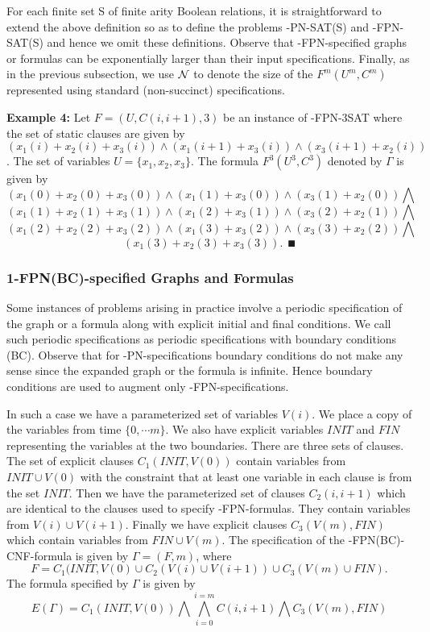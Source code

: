 For each finite set {\sf S} of finite arity Boolean relations, 
it is straightforward to extend the above 
definition so as to define the problems {-PN-SAT(S)}  
and {-FPN-SAT(S)}  and  hence we omit these
definitions.  Observe that 
{-FPN}-specified graphs or formulas can be exponentially larger 
than their input specifications. Finally, as in the previous subsection, 
we use ${\cal N}$ to denote the size of the $F^m(U^m, C^m)$ represented
using standard (non-succinct) specifications.


	 
\noindent
{\bf Example 4:}
Let $F= (U,C(i, i+1),3)$ be an instance of  {-FPN-3SAT} 
where the set of static clauses are given by
$(x_1(i) + x_2(i) + x_3(i) )  \wedge 
(x_1(i+1) + x_3(i)) \wedge (x_3(i+1) + x_2(i))$.
The set of variables $U = \{ x_1, x_2, x_3 \}$.
The formula $F^3(U^3,C^3)$ denoted by $\Gamma$ is given by 
\[(x_1(0) + x_2(0) + x_3(0)) \wedge (x_1(1) + x_3(0)) \wedge (x_3(1) + x_2(0)) 
\bigwedge \]
\[(x_1(1) + x_2(1) + x_3(1)) \wedge (x_1(2) + x_3(1)) \wedge (x_3(2) + x_2(1)) 
\bigwedge \]
\[(x_1(2) + x_2(2) + x_3(2)) \wedge (x_1(3) + x_3(2)) \wedge (x_3(3) + x_2(2)) 
\bigwedge \]
\[(x_1(3) + x_2(3) + x_3(3)). ~~\QED\]



\subsubsection{1-FPN(BC)-specified Graphs and Formulas}
Some instances of problems arising in practice involve a periodic specification
of the graph or a formula along with explicit initial and final conditions.
We call such periodic specifications as periodic specifications with boundary
conditions ({\sf BC}). 
Observe that for {-PN}-specifications boundary conditions
do not make any sense since the expanded graph or the formula is infinite.
Hence boundary conditions are used to augment only {-FPN}-specifications.

In such a case we have a parameterized set of variables $V(i)$.
We place a copy of the variables from time $\{ 0, \cdots m \}$.
We also have explicit variables $INIT$ and $FIN$ 
representing the variables at the
two boundaries. There are three sets of clauses.
The set of explicit clauses $C_1(INIT, V(0))$ contain variables from 
$INIT \cup V(0)$  with the constraint that at least one variable in each clause
is from the set $INIT$. Then we have the parameterized set of clauses
$C_2(i, i+1)$ which are identical to the clauses used to specify 
{-FPN}-formulas. They contain variables from $V(i) \cup V(i+1)$.
Finally we have explicit clauses $C_3(V(m), FIN)$ which contain variables from
$FIN \cup V(m)$. 
The specification of the {-FPN(BC)-CNF}-formula is given by
$\Gamma = ( F, m)$, where 
\[F = C_1(INIT, V(0) \cup C_2(V(i) \cup V(i+1)) \cup C_3(V(m) \cup FIN). \]
The formula specified by $\Gamma$ is given by 
\[E(\Gamma) =  
C_1(INIT, V(0)) \bigwedge \bigwedge_{i = 0}^{ i = m} C(i, i+1) \bigwedge 
C_3(V(m), FIN)   \]
